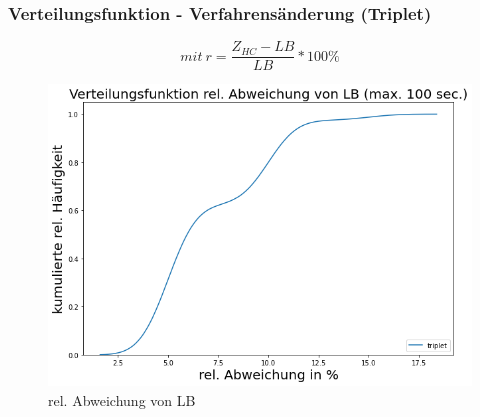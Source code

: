 \documentclass{beamer}
\begin{document}
\begin{frame}

\frametitle{Verteilungsfunktion - Verfahrensänderung (Triplet)}

\begin{footnotesize}
\begin{equation}
mit \ r = \frac{Z_{HC}-LB}{LB} * 100\%
\end{equation}
\end{footnotesize}

\begin{figure}[!htbp]
\begin{center}
\includegraphics[scale=0.3]{img/dist_trip0.png}
\end{center}
\caption{rel. Abweichung von LB}
\label{fig:architecture}
\end{figure}



\end{frame}
%
%
\end{document}
